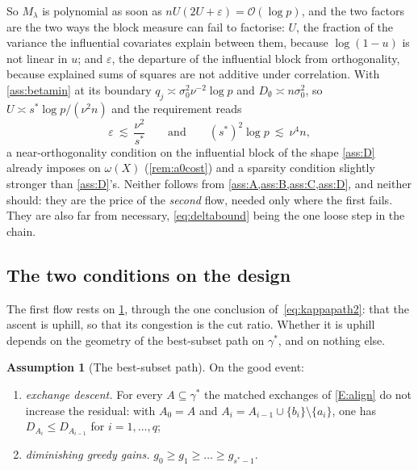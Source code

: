 \documentclass[aos]{imsart}
\newcommand{\OO}{\mathcal{O}}  %
\theoremstyle{plain}
\theoremstyle{definition}
\newtheorem{assumption}{Assumption}[section]
\begin{document}
    So $M_\lambda$ is polynomial as soon as
    $nU(2U+\varepsilon)=\OO(\log p)$, and the two factors are the two ways
    the block measure can fail to factorise: $U$, the fraction of the
    variance the influential covariates explain between them, because
    $\log(1-u)$ is not linear in $u$; and $\varepsilon$, the departure of
    the influential block from orthogonality, because explained sums of
    squares are not additive under correlation. With \cref{ass:betamin} at
    its boundary $q_j\asymp\sigma_0^{2}\nu^{-2}\log p$ and
    $D_\emptyset\asymp n\sigma_0^{2}$, so $U\asymp s^{\ast}\log
    p/(\nu^{2}n)$ and the requirement reads
    \begin{equation}
        \label{eq:crossregime}
        \varepsilon\ \lesssim\ \frac{\nu^{2}}{s^{\ast}}
        \qquad\text{and}\qquad
        (s^{\ast})^{2}\log p\ \lesssim\ \nu^{4}n ,
    \end{equation}
    a near-orthogonality condition on the influential block of the shape
    \cref{ass:D} already imposes on $\omega(X)$ (\cref{rem:a0cost}) and a
    sparsity condition slightly stronger than \cref{ass:D}'s. Neither
    follows from \cref{ass:A,ass:B,ass:C,ass:D}, and neither should: they
    are the price of the \emph{second} flow, needed only where the first
    fails. They are also far from necessary, \eqref{eq:deltabound} being the
    one loose step in the chain.

    \subsection{The two conditions on the design}
    \label{sub:dip}

    The first flow rests on \cref{ass:BB}, through the one conclusion
    of~\eqref{eq:kappapath2}: that the ascent is uphill, so that its
    congestion is the cut ratio. Whether it is uphill depends on the
    geometry of the best-subset path on $\gamma^{\ast}$, and on nothing
    else.

    \begin{assumption}[The best-subset path]
        \label{ass:BB}
        On the good event:
        \begin{enumerate}[label=(B\arabic*),leftmargin=3.4em]
            \item\label{B:exch} \emph{exchange descent.} For every
            $A\subseteq\gamma^{\ast}$ the matched exchanges of
            \ref{E:align} do not increase the residual: with $A_0=A$ and
            $A_i=A_{i-1}\cup\{b_i\}\setminus\{a_i\}$, one has
            $D_{A_i}\leq D_{A_{i-1}}$ for $i=1,\dots,q$;
            \item\label{B:dim} \emph{diminishing greedy gains.}
            $g_0\geq g_1\geq\dots\geq g_{s^{\ast}-1}$.
        \end{enumerate}
    \end{assumption}
\end{document}
